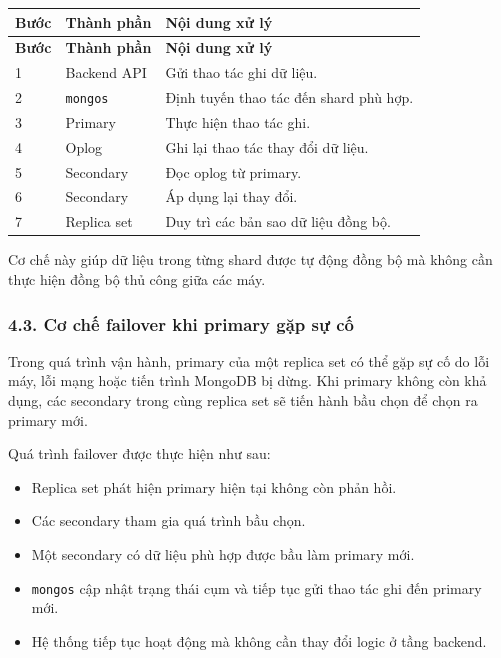 \documentclass[12pt,a4paper]{article}
\begin{document}
\begin{center}
\small
\begin{longtable}{|p{1cm}|p{2.8cm}|p{8cm}|}
\hline
\textbf{Bước} & \textbf{Thành phần} & \textbf{Nội dung xử lý} \\ \hline
\endfirsthead
\hline
\textbf{Bước} & \textbf{Thành phần} & \textbf{Nội dung xử lý} \\ \hline
\endhead
1 & Backend API & Gửi thao tác ghi dữ liệu. \\ \hline
2 & \texttt{mongos} & Định tuyến thao tác đến shard phù hợp. \\ \hline
3 & Primary & Thực hiện thao tác ghi. \\ \hline
4 & Oplog & Ghi lại thao tác thay đổi dữ liệu. \\ \hline
5 & Secondary & Đọc oplog từ primary. \\ \hline
6 & Secondary & Áp dụng lại thay đổi. \\ \hline
7 & Replica set & Duy trì các bản sao dữ liệu đồng bộ. \\ \hline
\end{longtable}
\normalsize
\end{center}

Cơ chế này giúp dữ liệu trong từng shard được tự động đồng bộ mà không cần thực hiện đồng bộ thủ công giữa các máy.

\subsubsection*{4.3. Cơ chế failover khi primary gặp sự cố}

Trong quá trình vận hành, primary của một replica set có thể gặp sự cố do lỗi máy, lỗi mạng hoặc tiến trình MongoDB bị dừng. Khi primary không còn khả dụng, các secondary trong cùng replica set sẽ tiến hành bầu chọn để chọn ra primary mới.

Quá trình failover được thực hiện như sau:

\begin{itemize}
    \item Replica set phát hiện primary hiện tại không còn phản hồi.
    \item Các secondary tham gia quá trình bầu chọn.
    \item Một secondary có dữ liệu phù hợp được bầu làm primary mới.
    \item \texttt{mongos} cập nhật trạng thái cụm và tiếp tục gửi thao tác ghi đến primary mới.
    \item Hệ thống tiếp tục hoạt động mà không cần thay đổi logic ở tầng backend.
\end{itemize}
\end{document}
